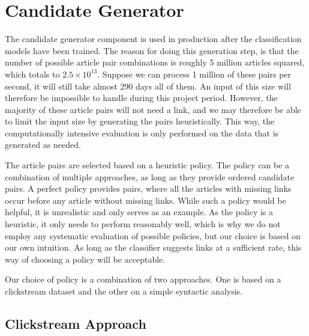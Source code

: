 \section{Candidate Generator}

The candidate generator component is used in production after the classification models have been trained. The reason for doing this generation step, is that the number of possible article pair combinations is roughly 5 million articles squared, which totals to $2.5 \times 10^{13}$. Suppose we can process 1 million of these pairs per second, it will still take almost 290 days all of them. An input of this size will therefore be impossible to handle during this project period. However, the majority of these article pairs will not need a link, and we may therefore be able to limit the input size by generating the pairs heuristically. This way, the computationally intensive evaluation is only performed on the data that is generated as needed.

The article pairs are selected based on a heuristic policy. The policy can be a combination of multiple approaches, as long as they provide ordered candidate pairs. A perfect policy provides pairs, where all the articles with missing links occur before any article without missing links. While such a policy would be helpful, it is unrealistic and only serves as an example. As the policy is a heuristic, it only needs to perform reasonably well, which is why we do not employ any systematic evaluation of possible policies, but our choice is based on our own intuition. As long as the classifier suggests links at a sufficient rate, this way of choosing a policy will be acceptable.

Our choice of policy is a combination of two approaches. One is based on a clickstream dataset and the other on a simple syntactic analysis.

\subsection{Clickstream Approach}

